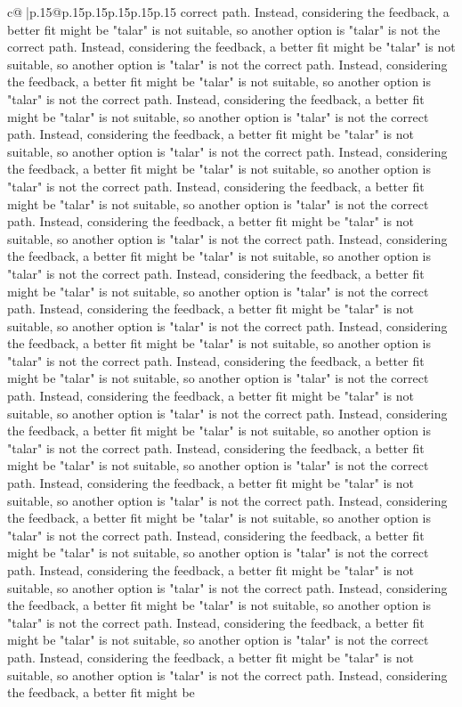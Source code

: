 \documentclass{article}
\begin{document}
{\begin{supertabular}{c@{$\;$}|p{.15\linewidth}@{}p{.15\linewidth}p{.15\linewidth}p{.15\linewidth}p{.15\linewidth}p{.15\linewidth}}
{{{correct path. Instead, considering the feedback, a better fit might be "talar" is not suitable, so another option is "talar" is not the correct path. Instead, considering the feedback, a better fit might be "talar" is not suitable, so another option is "talar" is not the correct path. Instead, considering the feedback, a better fit might be "talar" is not suitable, so another option is "talar" is not the correct path. Instead, considering the feedback, a better fit might be "talar" is not suitable, so another option is "talar" is not the correct path. Instead, considering the feedback, a better fit might be "talar" is not suitable, so another option is "talar" is not the correct path. Instead, considering the feedback, a better fit might be "talar" is not suitable, so another option is "talar" is not the correct path. Instead, considering the feedback, a better fit might be "talar" is not suitable, so another option is "talar" is not the correct path. Instead, considering the feedback, a better fit might be "talar" is not suitable, so another option is "talar" is not the correct path. Instead, considering the feedback, a better fit might be "talar" is not suitable, so another option is "talar" is not the correct path. Instead, considering the feedback, a better fit might be "talar" is not suitable, so another option is "talar" is not the correct path. Instead, considering the feedback, a better fit might be "talar" is not suitable, so another option is "talar" is not the correct path. Instead, considering the feedback, a better fit might be "talar" is not suitable, so another option is "talar" is not the correct path. Instead, considering the feedback, a better fit might be "talar" is not suitable, so another option is "talar" is not the correct path. Instead, considering the feedback, a better fit might be "talar" is not suitable, so another option is "talar" is not the correct path. Instead, considering the feedback, a better fit might be "talar" is not suitable, so another option is "talar" is not the correct path. Instead, considering the feedback, a better fit might be "talar" is not suitable, so another option is "talar" is not the correct path. Instead, considering the feedback, a better fit might be "talar" is not suitable, so another option is "talar" is not the correct path. Instead, considering the feedback, a better fit might be "talar" is not suitable, so another option is "talar" is not the correct path. Instead, considering the feedback, a better fit might be "talar" is not suitable, so another option is "talar" is not the correct path. Instead, considering the feedback, a better fit might be "talar" is not suitable, so another option is "talar" is not the correct path. Instead, considering the feedback, a better fit might be "talar" is not suitable, so another option is "talar" is not the correct path. Instead, considering the feedback, a better fit might be "talar" is not suitable, so another option is "talar" is not the correct path. Instead, considering the feedback, a better fit might be "talar" is not suitable, so another option is "talar" is not the correct path. Instead, considering the feedback, a better fit might be }}}
\end{supertabular}}
\end{document}
